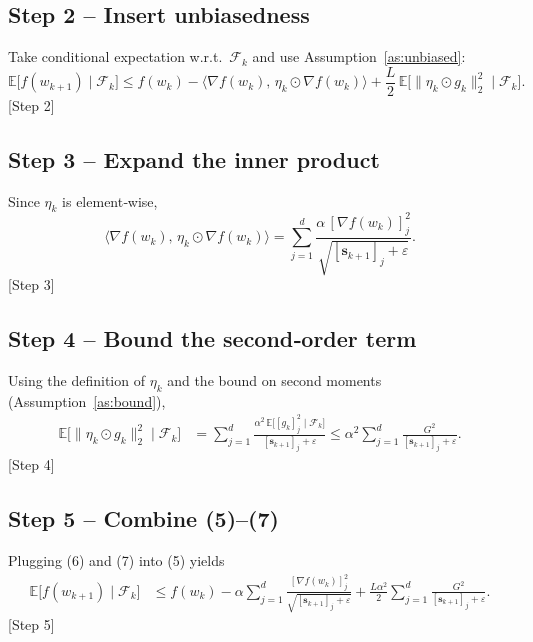 \documentclass{article}
\begin{document}
\subsection*{Step 2 – Insert unbiasedness}
Take conditional expectation w.r.t.\ $\mathcal{F}_k$ and use Assumption~\ref{as:unbiased}:
\[
\mathbb{E}\!\bigl[f(w_{k+1})\mid\mathcal{F}_k\bigr]
\le f(w_k) - \big\langle \nabla f(w_k),\,\eta_k\odot \nabla f(w_k) \big\rangle
     +\frac{L}{2}\,\mathbb{E}\!\bigl[\|\eta_k\odot g_k\|_2^{2}\mid\mathcal{F}_k\bigr].
\tag{5}
\]
[Step 2]

\subsection*{Step 3 – Expand the inner product}
Since $\eta_k$ is element‑wise,
\[
\big\langle \nabla f(w_k),\,\eta_k\odot \nabla f(w_k) \big\rangle
   = \sum_{j=1}^{d}\frac{\alpha\,[\nabla f(w_k)]_j^{2}}
                    {\sqrt{[\mathbf{s}_{k+1}]_j+\varepsilon}} .
\tag{6}
\]
[Step 3]

\subsection*{Step 4 – Bound the second‑order term}
Using the definition of $\eta_k$ and the bound on second moments (Assumption~\ref{as:bound}),
\[
\begin{aligned}
\mathbb{E}\!\bigl[\|\eta_k\odot g_k\|_2^{2}\mid\mathcal{F}_k\bigr]
 &= \sum_{j=1}^{d}\frac{\alpha^{2}\,\mathbb{E}\bigl[[g_k]_j^{2}\mid\mathcal{F}_k\bigr]}
                {[\mathbf{s}_{k+1}]_j+\varepsilon}
   \le \alpha^{2}\sum_{j=1}^{d}\frac{G^{2}}{[\mathbf{s}_{k+1}]_j+\varepsilon} .
\end{aligned}
\tag{7}
\]
[Step 4]

\subsection*{Step 5 – Combine (5)–(7)}
Plugging (6) and (7) into (5) yields
\[
\begin{aligned}
\mathbb{E}\!\bigl[f(w_{k+1})\mid\mathcal{F}_k\bigr]
 &\le f(w_k)
   -\alpha\sum_{j=1}^{d}\frac{[\nabla f(w_k)]_j^{2}}
                         {\sqrt{[\mathbf{s}_{k+1}]_j+\varepsilon}}
   +\frac{L\alpha^{2}}{2}\sum_{j=1}^{d}\frac{G^{2}}
                         {[\mathbf{s}_{k+1}]_j+\varepsilon}.
\end{aligned}
\tag{8}
\]
[Step 5]
\end{document}
